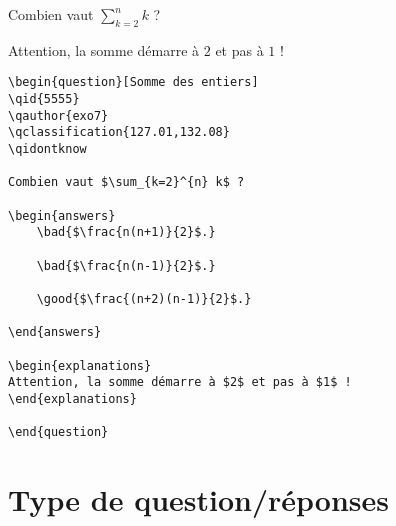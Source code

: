 \documentclass[12pt,a4paper]{article}
\begin{document}
\begin{center}
\begin{minipage}{0.8\textwidth}
\begin{question}
\qidontknow

Combien vaut $\sum_{k=2}^{n} k$ ?

\begin{answers}
    
    
\end{answers}

\begin{explanations}
Attention, la somme démarre à $2$ et pas à $1$ !
\end{explanations}

\end{question}
\end{minipage}
\end{center}

\begin{center}
\begin{minipage}{0.8\textwidth}
\begin{verbatim}
\begin{question}[Somme des entiers]
\qid{5555}
\qauthor{exo7}
\qclassification{127.01,132.08}
\qidontknow

Combien vaut $\sum_{k=2}^{n} k$ ?

\begin{answers}
    \bad{$\frac{n(n+1)}{2}$.}
    
    \bad{$\frac{n(n-1)}{2}$.} 
    
    \good{$\frac{(n+2)(n-1)}{2}$.}        

\end{answers}

\begin{explanations}
Attention, la somme démarre à $2$ et pas à $1$ !
\end{explanations}

\end{question}
\end{verbatim}
\end{minipage}
\end{center}


\section{Type de question/réponses}
\end{document}

